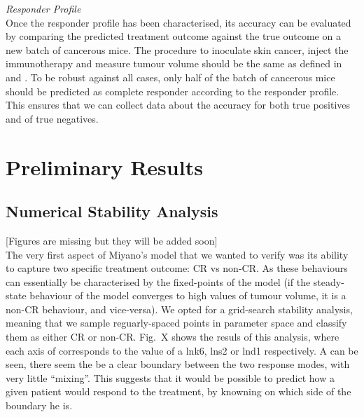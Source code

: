 \documentclass[11pt]{article}
\begin{document}
\textit{Responder Profile}\\[3pt]
Once the responder profile has been characterised, its accuracy can be evaluated by comparing the predicted treatment outcome against the true outcome on a new batch of cancerous mice. The procedure to inoculate skin cancer, inject the immunotherapy and measure tumour volume should be the same as defined in \cite{cbdil12} and \cite{takuya}. To be robust against all cases, only half of the batch of cancerous mice should be predicted as complete responder according to the responder profile. This ensures that we can collect data about the accuracy for both true positives and of true negatives.

\section{Preliminary Results}
\subsection{Numerical Stability Analysis}
[Figures are missing but they will be added soon]\\
The very first aspect of Miyano's model that we wanted to verify was its ability to capture two specific treatment outcome: CR vs non-CR. As these behaviours can essentially be characterised by the fixed-points of the model (if the steady-state behaviour of the model converges to high values of tumour volume, it is a non-CR behaviour, and vice-versa). We opted for a grid-search stability analysis, meaning that we sample reguarly-spaced points in parameter space and classify them as either CR or non-CR. Fig.~X shows the resuls of this analysis, where each axis of corresponds to the value of a lnk6, lns2 or lnd1 respectively. A can be seen, there seem the be a clear boundary between the two response modes, with very little ``mixing''. This suggests that it would be possible to predict how a given patient would respond to the treatment, by knowning on which side of the boundary he is.
\end{document}

